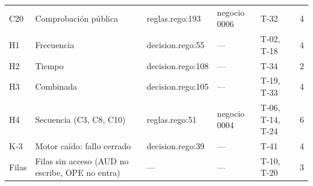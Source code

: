 \begin{center}
\begin{longtable}{@{}p{1.0cm} p{4.6cm} p{2.4cm} p{2.7cm} p{2.9cm} p{1.2cm}@{}}
C20 & Comprobación pública & reglas.rego:193 & negocio 0006 & T-32 & 4  \\
H1 & Frecuencia & decision.rego:55 & — & T-02, T-18 & 4  \\
H2 & Tiempo & decision.rego:108 & — & T-34 & 2  \\
H3 & Combinada & decision.rego:105 & — & T-19, T-33 & 4  \\
H4 & Secuencia (C3, C8, C10) & reglas.rego:51 & negocio 0004 & T-06, T-14, T-24 & 6  \\
K-3 & Motor caído: fallo cerrado & decision.rego:39 & — & T-41 & 4  \\
Filas & Filas sin acceso (AUD no escribe, OPE no entra) & — & — & T-10, T-20 & 3  \\
\bottomrule
\end{longtable}
\end{center}
